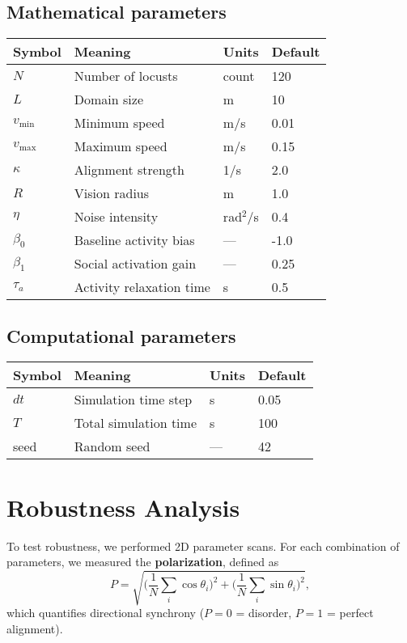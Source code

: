 \documentclass[11pt,a4paper]{article}
\begin{document}
\subsection{Mathematical parameters}

\begin{tabular}{@{}llll@{}}
\toprule
Symbol & Meaning & Units & Default \\
\midrule
$N$ & Number of locusts & count & 120 \\
$L$ & Domain size & m & 10 \\
$v_{\min}$ & Minimum speed & m/s & 0.01 \\
$v_{\max}$ & Maximum speed & m/s & 0.15 \\
$\kappa$ & Alignment strength & 1/s & 2.0 \\
$R$ & Vision radius & m & 1.0 \\
$\eta$ & Noise intensity & rad$^2$/s & 0.4 \\
$\beta_0$ & Baseline activity bias & --- & -1.0 \\
$\beta_1$ & Social activation gain & --- & 0.25 \\
$\tau_a$ & Activity relaxation time & s & 0.5 \\
\bottomrule
\end{tabular}

\subsection{Computational parameters}

\begin{tabular}{@{}llll@{}}
\toprule
Symbol & Meaning & Units & Default \\
\midrule
$dt$ & Simulation time step & s & 0.05 \\
$T$ & Total simulation time & s & 100 \\
seed & Random seed & --- & 42 \\
\bottomrule
\end{tabular}

\section{Robustness Analysis}

To test robustness, we performed 2D parameter scans. For each combination of parameters, we measured the \textbf{polarization}, defined as
\[
P = \sqrt{\Big(\frac{1}{N}\sum_i \cos \theta_i\Big)^2 + \Big(\frac{1}{N}\sum_i \sin \theta_i\Big)^2},
\]
which quantifies directional synchrony ($P=0$ = disorder, $P=1$ = perfect alignment).
\end{document}
